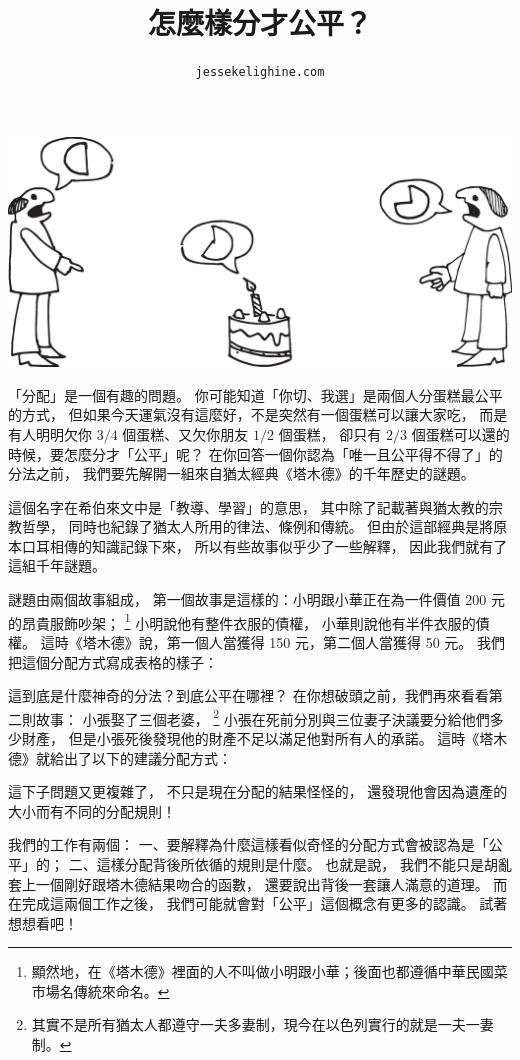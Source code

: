 \documentclass[10pt]{article}
\title{怎麼樣分才公平？}
\author{\texttt{jessekelighine.com}}
\begin{document}
\begin{multicols*}{2}

\maketitle
\begin{center}
	\includegraphics[height=0.33\columnwidth]{cartoon-01.eps}
\end{center}
\noindent
「分配」是一個有趣的問題。
你可能知道「你切、我選」是兩個人分蛋糕最公平的方式，
但如果今天運氣沒有這麼好，不是突然有一個蛋糕可以讓大家吃，
而是有人明明欠你 $3/4$ 個蛋糕、又欠你朋友 $1/2$ 個蛋糕，
卻只有 $2/3$ 個蛋糕可以還的時候，要怎麼分才「公平」呢？
在你回答一個你認為「唯一且公平得不得了」的分法之前，
我們要先解開一組來自猶太經典《塔木德》的千年歷史的謎題。

這個名字在希伯來文中是「教導、學習」的意思，
其中除了記載著與猶太教的宗教哲學，
同時也紀錄了猶太人所用的律法、條例和傳統。
但由於這部經典是將原本口耳相傳的知識記錄下來，
所以有些故事似乎少了一些解釋，
因此我們就有了這組千年謎題。

謎題由兩個故事組成，
第一個故事是這樣的：小明跟小華正在為一件價值 200 元的昂貴服飾吵架；
\footnote{
	顯然地，在《塔木德》裡面的人不叫做小明跟小華；後面也都遵循中華民國菜市場名傳統來命名。
}
小明說他有整件衣服的債權，
小華則說他有半件衣服的債權。
這時《塔木德》說，第一個人當獲得 150 元，第二個人當獲得 50 元。
我們把這個分配方式寫成表格的樣子：

這到底是什麼神奇的分法？到底公平在哪裡？
在你想破頭之前，我們再來看看第二則故事：
小張娶了三個老婆，
\footnote{
	其實不是所有猶太人都遵守一夫多妻制，現今在以色列實行的就是一夫一妻制。
}
小張在死前分別與三位妻子決議要分給他們多少財產，
但是小張死後發現他的財產不足以滿足他對所有人的承諾。
這時《塔木德》就給出了以下的建議分配方式：

這下子問題又更複雜了，
不只是現在分配的結果怪怪的，
還發現他會因為遺產的大小而有不同的分配規則！

我們的工作有兩個：
一、要解釋為什麼這樣看似奇怪的分配方式會被認為是「公平」的；
二、這樣分配背後所依循的規則是什麼。
也就是說，
我們不能只是胡亂套上一個剛好跟塔木德結果吻合的函數，
還要說出背後一套讓人滿意的道理。
而在完成這兩個工作之後，
我們可能就會對「公平」這個概念有更多的認識。
試著想想看吧！


\end{multicols*}
\end{document}
